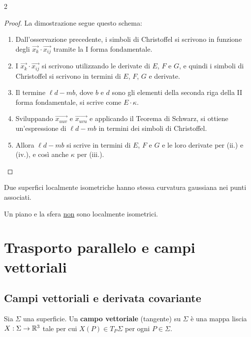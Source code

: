 \begin{multicols*}{2}
    \begin{proof}
        La dimostrazione segue questo schema:
        \begin{enumerate}[(i.)]
            \item Dall'osservazione precedente, i simboli di Christoffel si
                  scrivono in funzione degli $\vec{x_k} \cdot \vec{x_{ij}}$ tramite
                  la I forma fondamentale.
            \item I $\vec{x_k} \cdot \vec{x_{ij}}$ si scrivono utilizzando le derivate
                  di $E$, $F$ e $G$, e quindi i simboli di Christoffel si scrivono
                  in termini di $E$, $F$, $G$ e derivate.
            \item Il termine $\ell d - m b$, dove $b$ e $d$ sono gli elementi della
                  seconda riga della II forma fondamentale, si scrive come $E \cdot \kappa$.
            \item Sviluppando $\vec{x_{uuv}}$ e $\vec{x_{uvu}}$ e applicando il Teorema
                  di Schwarz, si ottiene un'espressione di $\ell d - m b$ in termini dei
                  simboli di Christoffel.
            \item Allora $\ell d - m b$ si scrive in termini di $E$, $F$ e $G$ e le loro derivate
                  per (ii.) e (iv.),
                  e così anche $\kappa$ per (iii.).
        \end{enumerate}
    \end{proof}

    \begin{corollary}
        Due superfici localmente isometriche hanno stessa curvatura gaussiana nei
        punti associati.
    \end{corollary}

    \begin{corollary}
        Un piano e la sfera \underline{non} sono localmente isometrici.
    \end{corollary}

    \section{Trasporto parallelo e campi vettoriali}

    \subsection{Campi vettoriali e derivata covariante}

    \begin{definition}
        Sia $\Sigma$ una superficie. Un \textbf{campo vettoriale} (tangente) su $\Sigma$
        è una mappa liscia $X : \Sigma \to \mathbb{R}^3$ tale per cui
        $X(P) \in T_P \Sigma$ per ogni $P \in \Sigma$.
    \end{definition}


\end{multicols*}
